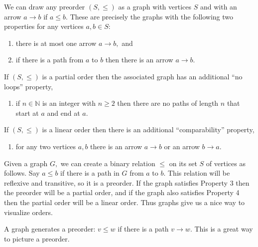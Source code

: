 \documentclass[../main/CT4S-EN-RU]{subfiles}
\begin{document}
\begin{remarkENG}\label{rem:preorder to graph}
We can draw any preorder $(S,\leq)$ as a graph with vertices $S$ and with an arrow $a{→} b$ if $a\leq b.$ These are precisely the graphs with the following two properties for any vertices $a,b\in S$:
\begin{enumerate}[\hsp 1.]
\item there is at most one arrow $a{→} b,$ and
\item if there is a path from $a$ to $b$ then there is an arrow $a{→} b.$
\end{enumerate}
If $(S,\leq)$ is a partial order then the associated graph has an additional “no loops” property,
\begin{enumerate}[\hsp 3.]
\item if $n\in{ℕ}$ is an integer with $n\geq 2$ then there are no paths of length $n$ that start at $a$ and end at $a.$
\end{enumerate}
If $(S,\leq)$ is a linear order then there is an additional “comparability” property,
\begin{enumerate}[\hsp 4.]
\item for any two vertices $a,b$ there is an arrow $a{→} b$ or an arrow $b{→} a.$
\end{enumerate}

Given a graph $G,$ we can create a binary relation $\leq$ on its set $S$ of vertices as follows. Say $a\leq b$ if there is a path in $G$ from $a$ to $b.$ This relation will be reflexive and transitive, so it is a preorder. If the graph satisfies Property 3 then the preorder will be a partial order, and if the graph also satisfies Property 4 then the partial order will be a linear order. Thus graphs give us a nice way to visualize orders.
\end{remarkENG}

\begin{remarkRUS}\label{rem:preorder to graph}
\end{remarkRUS}

\begin{sloganENG}
A graph generates a preorder: $v\leq w$ if there is a path $v{→} w.$ This is a great way to picture a preorder. 
\end{sloganENG}

\begin{sloganRUS}
\end{sloganRUS}
\end{document}
